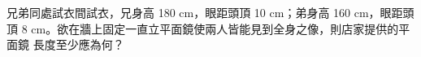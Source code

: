 \documentclass[cn,10pt,math=newtx,chinesefont=founder]{elegantbook}
\begin{document}
\begin{example}
    兄弟同處試衣間試衣，兄身高 180 cm，眼距頭頂 10 cm；弟身高 160 cm，眼距頭頂
    8 cm。欲在牆上固定一直立平面鏡使兩人皆能見到全身之像，則店家提供的平面鏡
    長度至少應為何？\\
    \rightline{[雄中科學班104]}
\end{example}
\begin{solution}
    
\end{solution}
\end{document}

